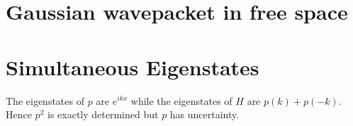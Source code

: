 \documentclass{article}
\title{}
\date{}
\newcommand{\<}{\langle}
\renewcommand{\>}{\rangle}
\begin{document}
\maketitle

\section{Gaussian wavepacket in free space}
\section{Simultaneous Eigenstates}

The eigenstates of $p$ are $e^{ikx}$ while the eigenstates of $H$ are $p(k) + p(-k)$. Hence $p^2$ is exactly determined but $p$ has uncertainty.
\end{document}
